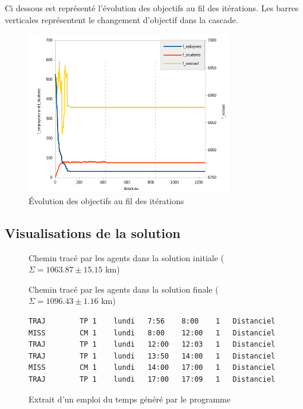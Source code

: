 \documentclass[11pt]{article}
\begin{document}
Ci dessous est représenté l'évolution des objectifs au fil des itérations. Les barres verticales représentent le changement d'objectif dans la cascade.

\begin{figure}[H]
    \centering
    \includegraphics[width=0.8\textwidth]{Images/score_evolution_graph.png}
    \caption{Évolution des objectifs au fil des itérations}
    \label{fig:score_evolution}
\end{figure}

\subsection{Visualisations de la solution}

\begin{figure}[H]
    \caption{Chemin tracé par les agents dans la solution initiale ($\Sigma = 1063.87 \pm 15.15$ km)}
    
\end{figure}

\begin{figure}[H]
    \caption{Chemin tracé par les agents dans la solution finale ($\Sigma = 1096.43 \pm 1.16$ km)}
    
\end{figure}


\newpage
\begin{figure}[H]
    \centering
    \begin{lstlisting}
TRAJ 		TP 1 	lundi 	7:56 	8:00 	1 	Distanciel
MISS 		CM 1 	lundi 	8:00 	12:00 	1 	Distanciel
TRAJ 		TP 1 	lundi 	12:00 	12:03 	1 	Distanciel
TRAJ 		TP 1 	lundi 	13:50 	14:00 	1 	Distanciel
MISS 		CM 1 	lundi 	14:00 	17:00 	1 	Distanciel
TRAJ 		TP 1 	lundi 	17:00 	17:09 	1 	Distanciel
    \end{lstlisting}
    \caption{Extrait d'un emploi du temps généré par le programme}
    \label{fig:edt_raw}
\end{figure}
\end{document}
